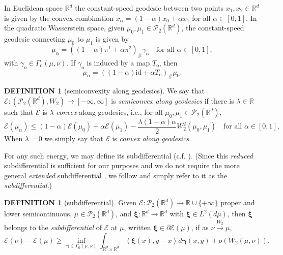 \documentclass[11pt,leqno]{amsart}
\theoremstyle{definition}
\newtheorem{defi}[thm]{DEFINITION}
\newcommand{\bes}{\begin{equation*}}
\newcommand{\ees}{\end{equation*}}
\newcommand{\R}{{\mathord{\mathbb R}}}
\newcommand{\Rd}{{\mathord{\mathbb R}^d}}
\newcommand{\loc}{{\rm loc}}
\newcommand{\la}{\left\langle}
\newcommand{\ra}{\right\rangle}
\def\P{{\mathcal P}}
\newcommand{\bxi}{\boldsymbol{\xi}}
\newcommand{\bbeta}{\boldsymbol{\eta}}
\newcommand{\bgamma}{\boldsymbol{\gamma}}
\newcommand{\E}{\mathcal{E}}
\begin{document}
In Euclidean space $\R^d$ the constant-speed geodesic between two points $x_1,x_2 \in \R^d$ is given by the convex combination $x_\alpha = (1-\alpha) x_0 + \alpha x_1$ for all $\alpha\in[0,1]$. In the quadratic Wasserstein space, given $\mu_0,\mu_1 \in \P_2(\R^d)$, the constant-speed geodesic connecting $\mu_0$ to $\mu_1$ is given by
\bes
	\mu_\alpha = ((1-\alpha) \pi^1 + \alpha \pi^2)_\# \gamma_\mathrm{o} \quad \mbox{for all $\alpha\in[0,1]$},
\ees
with $\gamma_\mathrm{o}\in \Gamma_\mathrm{o}(\mu,\nu)$. If $\gamma_\mathrm{o}$ is induced by a map $T_\mathrm{o}$, then
\bes
	\mu_\alpha = ((1-\alpha)\text{id} + \alpha T_\mathrm{o})_\# \mu_0.
\ees
\begin{defi}[semiconvexity along geodesics]\label{defi:semiconvexity-geod}
We say that $\E\colon (\P_2(\R^d),W_2) \to [-\infty,\infty]$ is \emph{semiconvex along geodesics} if there is $\lambda \in \R$ such that $\E$ is \emph{$\lambda$-convex} along geodesics, i.e., for all $\mu_0,\mu_1\in \P_2(\R^d)$,
\bes
	\E(\mu_\alpha) \leq (1-\alpha)\E(\mu_0) + \alpha\E(\mu_1) - \frac{\lambda (1-\alpha)\alpha}{2} W_2^2(\mu_0,\mu_1) \quad \mbox{for all $\alpha\in[0,1]$},
\ees
When $\lambda=0$ we simply say that $\E$ is \emph{convex along geodesics}.
\end{defi}


For any such energy, we may define its subdifferential (c.f. \cite[Equation 10.3.12]{AGS}). (Since this \emph{reduced} subdifferential is sufficient for our purposes and we do not require the more general \emph{extended} subdifferential \cite[Definition 10.3.1]{AGS}, we follow \cite{5person} and simply refer to it as the \emph{subdifferential}.)
\begin{defi}[subdifferential] \label{subdiffdef}
Given $\E:\P_2(\Rd) \to \R \cup \{+\infty\}$ proper  and lower semicontinuous, $\mu \in \P_2(\Rd)$, and $\bxi:\Rd \to \Rd$ with $\bxi \in L^2(d\mu)$, then $\bxi$ belongs to the \emph{subdifferential} of $\E$ at $\mu$, written $\bxi \in \partial \E(\mu)$, if as $\nu \xrightarrow{W_2} \mu$,
\[ \E(\nu) - \E(\mu) \geq \inf_{\bgamma \in \Gamma_0(\mu,\nu)} \int_{\Rd \times \Rd} \la \bxi(x),y-x \ra d\bgamma(x,y) + o(W_2(\mu,\nu)) . \]
\end{defi}
\end{document}
